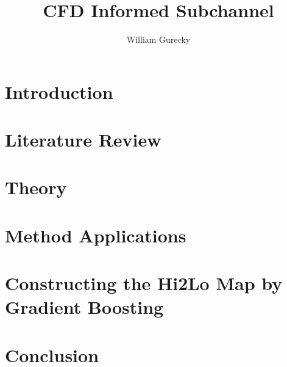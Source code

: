 \documentclass[12pt,a4paper]{report}
\author{William Gurecky}
\title{CFD Informed Subchannel}
\begin{document}








\onehalfspacing
\chapter{Introduction}
\label{chap:intro}


\chapter{Literature Review}
\label{chap:lit}


\chapter{Theory}
\label{chap:theory}


\chapter{Method Applications}
\label{chap:work}



\chapter{Constructing the Hi2Lo Map by Gradient Boosting}
\label{chap:fw}


\chapter{Conclusion}
\label{chap:conc}

\end{document}
